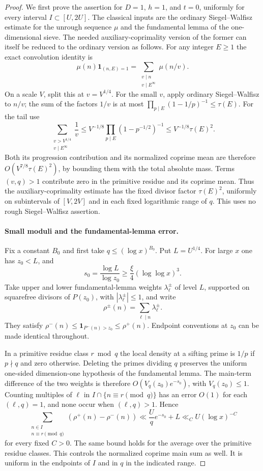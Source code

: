 \begin{proof}
We first prove the assertion for $D=1$, $h=1$, and $t=0$,
uniformly for every interval $I\subset[U,2U]$.
The classical inputs are the ordinary Siegel--Walfisz estimate
for the unrough sequence $\mu$ and the fundamental lemma of
the one-dimensional sieve. The needed auxiliary-coprimality
version of the former can itself be reduced to the ordinary
version as follows.
For any integer $E\ge1$ the exact convolution identity is
\[
 \mu(n)\mathbf1_{(n,E)=1}
       =\sum_{\substack{v\mid n\\v\mid E^\infty}}\mu(n/v).
\]
On a scale $V$, split this at $v=V^{1/4}$.
For the small $v$, apply ordinary Siegel--Walfisz to $n/v$;
the sum of the factors $1/v$ is at most
$\prod_{p\mid E}(1-1/p)^{-1}\le\tau(E)$.
For the tail use
\[
 \sum_{\substack{v>V^{1/4}\\v\mid E^\infty}}\frac1v
 \le V^{-1/8}\prod_{p\mid E}(1-p^{-1/2})^{-1}
 \le V^{-1/8}\tau(E)^2.
\]
Both its progression contribution and its normalized coprime
mean are therefore $O(V^{7/8}\tau(E)^2)$, by bounding them
with the total absolute mass. Terms $(v,q)>1$ contribute zero
in the primitive residue and its coprime mean.
Thus the auxiliary-coprimality estimate has the fixed divisor
factor $\tau(E)^2$, uniformly on subintervals of $[V,2V]$
and in each fixed logarithmic range of $q$.
This uses no rough Siegel--Walfisz assertion.

\paragraph{Small moduli and the fundamental-lemma error.}
Fix a constant $B_0$ and first take $q\le(\log x)^{B_0}$.
Put $L=U^{1/4}$. For large $x$ one has $z_0<L$, and
\[
 s_0=\frac{\log L}{\log z_0}
       \ge\frac{\xi}{4}(\log\log x)^3.
\]
Take upper and lower fundamental-lemma weights $\lambda^\pm_\ell$
of level $L$, supported on squarefree divisors of $P(z_0)$,
with $|\lambda^\pm_\ell|\le1$, and write
\[
 \rho^\pm(n)=\sum_{\ell\mid n}\lambda^\pm_\ell.
\]
They satisfy
$\rho^-(n)\le\mathbf1_{P^-(n)>z_0}\le\rho^+(n)$.
Endpoint conventions at $z_0$ can be made identical throughout.

In a primitive residue class $r\bmod q$ the local density at a
sifting prime is $1/p$ if $p\nmid q$ and zero otherwise.
Deleting the primes dividing $q$ preserves the uniform
one-sided dimension-one hypothesis of the fundamental lemma.
The main-term difference of the two weights is therefore
$O(V_q(z_0)e^{-s_0})$, with $V_q(z_0)\le1$.
Counting multiples of $\ell$ in $I\cap\{n\equiv r\pmod q\}$
has an error $O(1)$ for each $(\ell,q)=1$, and none occur
when $(\ell,q)>1$. Hence
\begin{equation}\label{eq:rough-beta-gap}
 \sum_{\substack{n\in I\\n\equiv r\pmod q}}
              (\rho^+(n)-\rho^-(n))
 \ll \frac Uq e^{-s_0}+L
 \ll_C U(\log x)^{-C}
\end{equation}
for every fixed $C>0$.
The same bound holds for the average over the primitive residue
classes. This controls the normalized coprime main sum as well.
It is uniform in the endpoints of $I$ and in $q$ in the indicated
range.


\end{proof}
